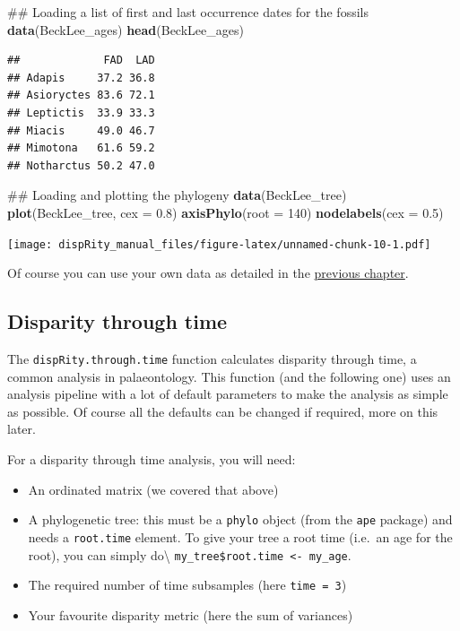 \documentclass[]{book}
\newenvironment{Shaded}{\begin{snugshade}}{\end{snugshade}}
\newcommand{\KeywordTok}[1]{\textcolor[rgb]{0.13,0.29,0.53}{\textbf{#1}}}
\newcommand{\DataTypeTok}[1]{\textcolor[rgb]{0.13,0.29,0.53}{#1}}
\newcommand{\DecValTok}[1]{\textcolor[rgb]{0.00,0.00,0.81}{#1}}
\newcommand{\FloatTok}[1]{\textcolor[rgb]{0.00,0.00,0.81}{#1}}
\newcommand{\NormalTok}[1]{#1}
\providecommand{\tightlist}{%
  \setlength{\itemsep}{0pt}\setlength{\parskip}{0pt}}
\theoremstyle{definition}
\theoremstyle{definition}
\theoremstyle{remark}
\begin{document}
\begin{Shaded}
\begin{Highlighting}[]
\NormalTok{## Loading a list of first and last occurrence dates for the fossils}
\KeywordTok{data}\NormalTok{(BeckLee_ages)}
\KeywordTok{head}\NormalTok{(BeckLee_ages)}
\end{Highlighting}
\end{Shaded}

\begin{verbatim}
##             FAD  LAD
## Adapis     37.2 36.8
## Asioryctes 83.6 72.1
## Leptictis  33.9 33.3
## Miacis     49.0 46.7
## Mimotona   61.6 59.2
## Notharctus 50.2 47.0
\end{verbatim}

\begin{Shaded}
\begin{Highlighting}[]
\NormalTok{## Loading and plotting the phylogeny}
\KeywordTok{data}\NormalTok{(BeckLee_tree)}
\KeywordTok{plot}\NormalTok{(BeckLee_tree, }\DataTypeTok{cex =} \FloatTok{0.8}\NormalTok{) }
\KeywordTok{axisPhylo}\NormalTok{(}\DataTypeTok{root =} \DecValTok{140}\NormalTok{)}
\KeywordTok{nodelabels}\NormalTok{(}\DataTypeTok{cex =} \FloatTok{0.5}\NormalTok{)}
\end{Highlighting}
\end{Shaded}

\texttt{[image: dispRity\_manual\_files/figure-latex/unnamed-chunk-10-1.pdf]}

Of course you can use your own data as detailed in the
\protect\hyperlink{What-sort-of-data-does-dispRity-work-with}{previous
chapter}.

\subsection{Disparity through time}\label{disparity-through-time}

The \texttt{dispRity.through.time} function calculates disparity through
time, a common analysis in palaeontology. This function (and the
following one) uses an analysis pipeline with a lot of default
parameters to make the analysis as simple as possible. Of course all the
defaults can be changed if required, more on this later.

For a disparity through time analysis, you will need:

\begin{itemize}
\tightlist
\item
  An ordinated matrix (we covered that above)
\item
  A phylogenetic tree: this must be a \texttt{phylo} object (from the
  \texttt{ape} package) and needs a \texttt{root.time} element. To give
  your tree a root time (i.e.~an age for the root), you can simply
  do\textbackslash{}
  \texttt{my\_tree\$root.time\ \textless{}-\ my\_age}.
\item
  The required number of time subsamples (here \texttt{time\ =\ 3})
\item
  Your favourite disparity metric (here the sum of variances)
\end{itemize}
\end{document}
